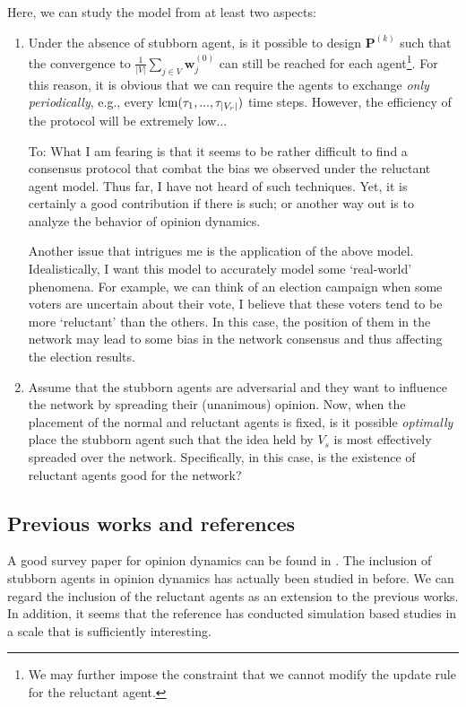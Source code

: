 \documentclass[10pt]{article}
\theoremstyle{t}
\begin{document}
Here, we can study the model from at least two aspects: \vspace{.2cm}
\begin{enumerate}
\item Under the absence of stubborn agent, is it possible to design ${\bm P}^{(k)}$ such that the convergence to $\frac{1}{|V|} \sum_{j \in V} {\bm w}_j^{(0)}$ can still be reached for each agent\footnote{We may further impose the constraint that we cannot modify the update rule for the reluctant agent.}. For this reason, it is obvious that we can require the agents to exchange \emph{only periodically}, e.g., every ${\rm lcm}(\tau_1,...,\tau_{|V_r|})$ time steps. However, the efficiency of the protocol will be extremely low...\vspace{.2cm}

{\color{red} To: What I am fearing is that it seems to be rather difficult to find a consensus protocol that combat the bias we observed under the reluctant agent model. Thus far, I have not heard of such techniques. Yet, it is certainly a good contribution if there is such; or another way out is to analyze the behavior of opinion dynamics.}\vspace{.2cm}

Another issue that intrigues me is the application of the above model. Idealistically, I want this model to accurately model some `real-world' phenomena. For example, we can think of an election campaign when some voters are uncertain about their vote, I believe that these voters tend to be more `reluctant' than the others. In this case, the position of them in the network may lead to some bias in the network consensus and thus affecting the election results. \vspace{.2cm}

\item Assume that the stubborn agents are adversarial and they want to influence the network by spreading their (unanimous) opinion. Now, when the placement of the normal and reluctant agents is fixed, is it possible \emph{optimally} place the stubborn agent such that the idea held by $V_s$ is most effectively spreaded over the network. Specifically, in this case, is the existence of reluctant agents good for the network?\end{enumerate}



\subsection{Previous works and references} 
A good survey paper for opinion dynamics can be found in \cite{Fagnani2014}. The inclusion of stubborn agents in opinion dynamics has actually been studied in \cite{Acemoglu2013} before. We can regard the inclusion of the reluctant agents as an extension to the previous works. In addition, it seems that the reference \cite{Das2014} has conducted simulation based studies in a scale that is sufficiently interesting.  \vspace{.2cm}
\end{document}

